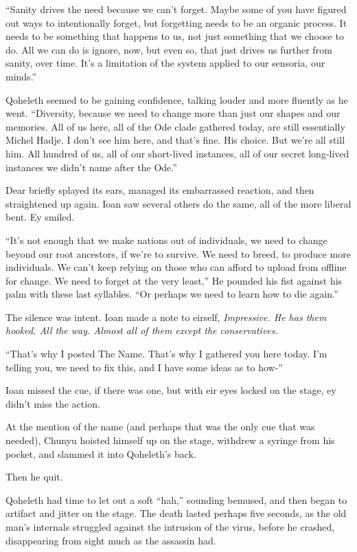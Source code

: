 ``Sanity drives the need because we can't forget. Maybe some of you have figured out ways to intentionally forget, but forgetting needs to be an organic process. It needs to be something that happens to us, not just something that we choose to do. All we can do is ignore, now, but even so, that just drives us further from sanity, over time. It's a limitation of the system applied to our sensoria, our minds.''

Qoheleth seemed to be gaining confidence, talking louder and more fluently as he went. ``Diversity, because we need to change more than just our shapes and our memories. All of us here, all of the Ode clade gathered today, are still essentially Michel Hadje. I don't see him here, and that's fine. His choice. But we're all still him. All hundred of us, all of our short-lived instances, all of our secret long-lived instances we didn't name after the Ode.''

Dear briefly splayed its ears, managed its embarrassed reaction, and then straightened up again. Ioan saw several others do the same, all of the more liberal bent. Ey smiled.

``It's not enough that we make nations out of individuals, we need to change beyond our root ancestors, if we're to survive. We need to breed, to produce more individuals. We can't keep relying on those who can afford to upload from offline for change. We need to forget at the very least,'' He pounded his fist against his palm with these last syllables. ``Or perhaps we need to learn how to die again.''

The silence was intent. Ioan made a note to eirself, \emph{Impressive. He has them hooked. All the way. Almost all of them except the conservatives.}

``That's why I posted The Name. That's why I gathered you here today. I'm telling you, we need to fix this, and I have some ideas as to how-''

Ioan missed the cue, if there was one, but with eir eyes locked on the stage, ey didn't miss the action.

At the mention of the name (and perhaps that was the only cue that was needed), Chunyu hoisted himself up on the stage, withdrew a syringe from his pocket, and slammed it into Qoheleth's back.

Then he quit.

Qoheleth had time to let out a soft ``hah,'' sounding bemused, and then began to artifact and jitter on the stage. The death lasted perhaps five seconds, as the old man's internals struggled against the intrusion of the virus, before he crashed, disappearing from sight much as the assassin had.

